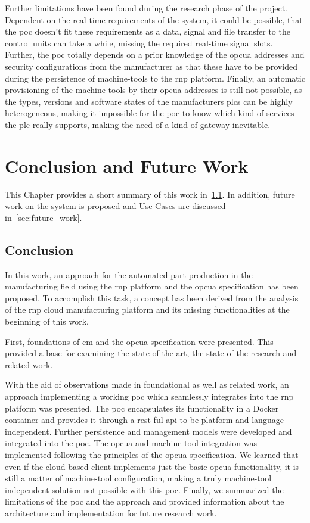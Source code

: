 \documentclass[
a4paper,
twoside,
headsepline,
cleardoublepage=empty,
parskip=half,
draft=false
]{scrbook}
\begin{document}
			Further limitations have been found during the research phase of the project. Dependent on the real-time requirements of the system, it could be possible, that the \gls{poc} doesn't fit these requirements as a data, signal and file transfer to the control units can take a while, missing the required real-time signal slots. Further, the \gls{poc} totally depends on a prior knowledge of the \gls{opcua} addresses and security configurations from the manufacturer as that these have to be provided during the persistence of machine-tools to the \gls{rnp} platform. Finally, an automatic provisioning of the machine-tools by their \gls{opcua} addresses is still not possible, as the types, versions and software states of the manufacturers \gls{plc}s can be highly heterogeneous, making it impossible for the \gls{poc} to know which kind of services the \gls{plc} really supports, making the need of a kind of gateway inevitable.

	\chapter{Conclusion and Future Work} \label{ch:conclusion_and_future_work}

		This Chapter provides a short summary of this work in~\cref{sec:conclusion}. In addition, future work on the system is proposed and Use-Cases are discussed in~\cref{sec:future_work}.

		\section{Conclusion}\label{sec:conclusion}

			In this work, an approach for the automated part production in the manufacturing field using the \gls{rnp} platform and the \gls{opcua} specification has been proposed. To accomplish this task, a concept has been derived from the analysis of the \gls{rnp} cloud manufacturing platform and its missing functionalities at the beginning of this work.

			First, foundations of \gls{cm} and the \gls{opcua} specification were presented. This provided a base for examining the state of the art, the state of the research and related work.

			With the aid of observations made in foundational as well as related work, an approach implementing a working \gls{poc} which seamlessly integrates into the \gls{rnp} platform was presented. The \gls{poc} encapsulates its functionality in a Docker container and provides it through a \gls{rest}-ful \gls{api} to be platform and language independent. Further persistence and management models were developed and integrated into the \gls{poc}. The \gls{opcua} and machine-tool integration was implemented following the principles of the \gls{opcua} specification. We learned that even if the cloud-based client implements just the basic \gls{opcua} functionality, it is still a matter of machine-tool configuration, making a truly machine-tool independent solution not possible with this \gls{poc}. Finally, we summarized the limitations of the \gls{poc} and the approach and provided information about the architecture and implementation for future research work.
\end{document}

